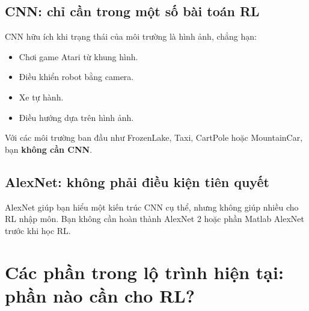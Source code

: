 \documentclass[12pt,a4paper]{article}
\begin{document}
\subsection{CNN: chỉ cần trong một số bài toán RL}

CNN hữu ích khi trạng thái của môi trường là hình ảnh, chẳng hạn:

\begin{itemize}[leftmargin=1.5em]
    \item Chơi game Atari từ khung hình.
    \item Điều khiển robot bằng camera.
    \item Xe tự hành.
    \item Điều hướng dựa trên hình ảnh.
\end{itemize}

Với các môi trường ban đầu như FrozenLake, Taxi, CartPole hoặc MountainCar, bạn \textbf{không cần CNN}.

\subsection{AlexNet: không phải điều kiện tiên quyết}

AlexNet giúp bạn hiểu một kiến trúc CNN cụ thể, nhưng không giúp nhiều cho RL nhập môn. Bạn không cần hoàn thành AlexNet 2 hoặc phần Matlab AlexNet trước khi học RL.

\section{Các phần trong lộ trình hiện tại: phần nào cần cho RL?}
\end{document}
